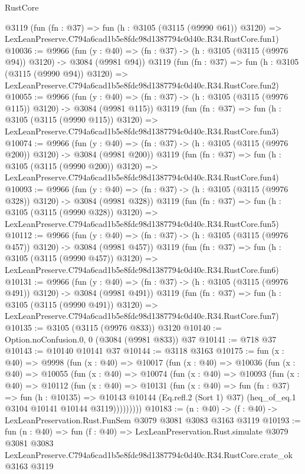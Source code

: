 \begin{lexlean}{RustCore}
\begin{coremodule}
    @3119
    (fun (fn : @37) =>
    fun (h : @3105 (@3115 (@9990 @61)) @3120) =>
    LexLeanPreserve.C794a6cad1b5e8fdc98d1387794c0d40c.R34.RustCore.fun1)
@10036 := @9966
    (fun (y : @40) => (fn : @37) -> (h : @3105 (@3115 (@9976 @94)) @3120) -> @3084 (@9981 @94))
    @3119
    (fun (fn : @37) =>
    fun (h : @3105 (@3115 (@9990 @94)) @3120) =>
    LexLeanPreserve.C794a6cad1b5e8fdc98d1387794c0d40c.R34.RustCore.fun2)
@10055 := @9966
    (fun (y : @40) => (fn : @37) -> (h : @3105 (@3115 (@9976 @115)) @3120) -> @3084 (@9981 @115))
    @3119
    (fun (fn : @37) =>
    fun (h : @3105 (@3115 (@9990 @115)) @3120) =>
    LexLeanPreserve.C794a6cad1b5e8fdc98d1387794c0d40c.R34.RustCore.fun3)
@10074 := @9966
    (fun (y : @40) => (fn : @37) -> (h : @3105 (@3115 (@9976 @200)) @3120) -> @3084 (@9981 @200))
    @3119
    (fun (fn : @37) =>
    fun (h : @3105 (@3115 (@9990 @200)) @3120) =>
    LexLeanPreserve.C794a6cad1b5e8fdc98d1387794c0d40c.R34.RustCore.fun4)
@10093 := @9966
    (fun (y : @40) => (fn : @37) -> (h : @3105 (@3115 (@9976 @328)) @3120) -> @3084 (@9981 @328))
    @3119
    (fun (fn : @37) =>
    fun (h : @3105 (@3115 (@9990 @328)) @3120) =>
    LexLeanPreserve.C794a6cad1b5e8fdc98d1387794c0d40c.R34.RustCore.fun5)
@10112 := @9966
    (fun (y : @40) => (fn : @37) -> (h : @3105 (@3115 (@9976 @457)) @3120) -> @3084 (@9981 @457))
    @3119
    (fun (fn : @37) =>
    fun (h : @3105 (@3115 (@9990 @457)) @3120) =>
    LexLeanPreserve.C794a6cad1b5e8fdc98d1387794c0d40c.R34.RustCore.fun6)
@10131 := @9966
    (fun (y : @40) => (fn : @37) -> (h : @3105 (@3115 (@9976 @491)) @3120) -> @3084 (@9981 @491))
    @3119
    (fun (fn : @37) =>
    fun (h : @3105 (@3115 (@9990 @491)) @3120) =>
    LexLeanPreserve.C794a6cad1b5e8fdc98d1387794c0d40c.R34.RustCore.fun7)
@10135 := @3105 (@3115 (@9976 @833)) @3120
@10140 := Option.noConfusion.{0, 0} (@3084 (@9981 @833)) @37
@10141 := @718 @37
@10143 := @10140 @10141 @37
@10144 := @3118 @3163
@10175 := fun (x : @40) =>
  @9998
    (fun (x : @40) =>
    @10017
      (fun (x : @40) =>
      @10036
        (fun (x : @40) =>
        @10055
          (fun (x : @40) =>
          @10074
            (fun (x : @40) =>
            @10093
              (fun (x : @40) =>
              @10112
                (fun (x : @40) =>
                @10131
                  (fun (x : @40) =>
                  fun (fn : @37) =>
                  fun (h : @10135) =>
                  @10143
                    @10144
                    (Eq.refl.{2} (Sort 1) @37)
                    (heq_of_eq.{1} @3104 @10141 @10144 @3119)))))))))
@10183 := (n : @40) -> (f : @40) -> LexLeanPreservation.Rust.FunSem @3079 @3081 @3083 @3163 @3119
@10193 := fun (n : @40) =>
  fun (f : @40) =>
  LexLeanPreservation.Rust.simulate
    @3079
    @3081
    @3083
    LexLeanPreserve.C794a6cad1b5e8fdc98d1387794c0d40c.R34.RustCore.crate_ok
    @3163
    @3119
\end{coremodule}
\end{lexlean}
